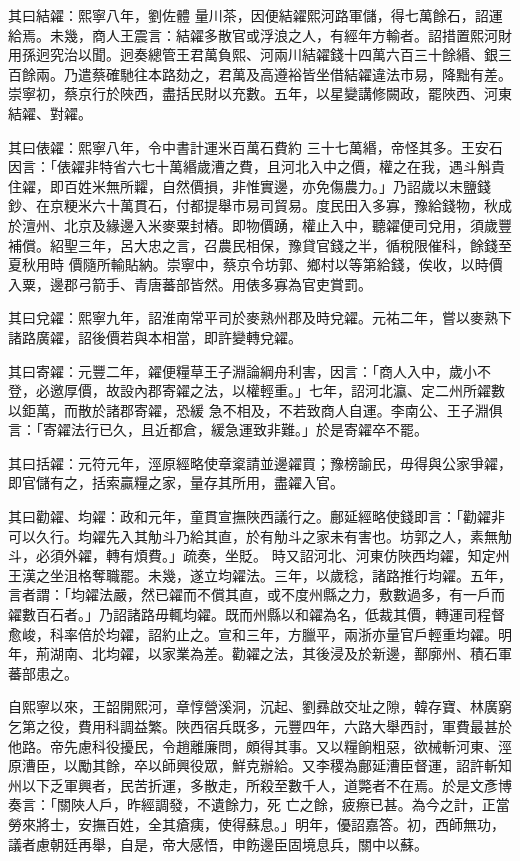 \begin{pinyinscope}
 其曰結糴：熙寧八年，劉佐體
 量川茶，因便結糴熙河路軍儲，得七萬餘石，詔運給焉。未幾，商人王震言：結糴多散官或浮浪之人，有經年方輸者。詔措置熙河財用孫迥究治以聞。迥奏總管王君萬負熙、河兩川結糴錢十四萬六百三十餘緡、銀三百餘兩。乃遣蔡確馳往本路劾之，君萬及高遵裕皆坐借結糴違法市易，降黜有差。崇寧初，蔡京行於陜西，盡括民財以充數。五年，以星變講修闕政，罷陜西、河東結糴、對糴。



 其曰俵糴：熙寧八年，令中書計運米百萬石費約
 三十七萬緡，帝怪其多。王安石因言：「俵糴非特省六七十萬緡歲漕之費，且河北入中之價，權之在我，遇斗斛貴住糴，即百姓米無所糶，自然價損，非惟實邊，亦免傷農力。」乃詔歲以末鹽錢鈔、在京粳米六十萬貫石，付都提舉市易司貿易。度民田入多寡，豫給錢物，秋成於澶州、北京及緣邊入米麥粟封樁。即物價踴，權止入中，聽糴便司兌用，須歲豐補償。紹聖三年，呂大忠之言，召農民相保，豫貸官錢之半，循稅限催科，餘錢至夏秋用時
 價隨所輸貼納。崇寧中，蔡京令坊郭、鄉村以等第給錢，俟收，以時價入粟，邊郡弓箭手、青唐蕃部皆然。用俵多寡為官吏賞罰。



 其曰兌糴：熙寧九年，詔淮南常平司於麥熟州郡及時兌糴。元祐二年，嘗以麥熟下諸路廣糴，詔後價若與本相當，即許變轉兌糴。



 其曰寄糴：元豐二年，糴便糧草王子淵論綱舟利害，因言：「商人入中，歲小不登，必邀厚價，故設內郡寄糴之法，以權輕重。」七年，詔河北瀛、定二州所糴數以鉅萬，而散於諸郡寄糴，恐緩
 急不相及，不若致商人自運。李南公、王子淵俱言：「寄糴法行已久，且近都倉，緩急運致非難。」於是寄糴卒不罷。



 其曰括糴：元符元年，涇原經略使章楶請並邊糴買；豫榜諭民，毋得與公家爭糴，即官儲有之，括索贏糧之家，量存其所用，盡糴入官。



 其曰勸糴、均糴：政和元年，童貫宣撫陜西議行之。鄜延經略使錢即言：「勸糴非可以久行。均糴先入其觔斗乃給其直，於有觔斗之家未有害也。坊郭之人，素無觔斗，必須外糴，轉有煩費。」疏奏，坐貶。
 時又詔河北、河東仿陜西均糴，知定州王漢之坐沮格奪職罷。未幾，遂立均糴法。三年，以歲稔，諸路推行均糴。五年，言者謂：「均糴法嚴，然已糴而不償其直，或不度州縣之力，敷數過多，有一戶而糴數百石者。」乃詔諸路毋輒均糴。既而州縣以和糴為名，低裁其價，轉運司程督愈峻，科率倍於均糴，詔約止之。宣和三年，方臘平，兩浙亦量官戶輕重均糴。明年，荊湖南、北均糴，以家業為差。勸糴之法，其後浸及於新邊，鄯廓州、積石軍蕃部患之。



 自熙寧以來，王韶開熙河，章惇營溪洞，沉起、劉彞啟交址之隙，韓存寶、林廣窮乞第之役，費用科調益繁。陜西宿兵既多，元豐四年，六路大舉西討，軍費最甚於他路。帝先慮科役擾民，令趙離廉問，頗得其事。又以糧餉粗惡，欲械斬河東、涇原漕臣，以勵其餘，卒以師興役眾，鮮克辦給。又李稷為鄜延漕臣督運，詔許斬知州以下乏軍興者，民苦折運，多散走，所殺至數千人，道斃者不在焉。於是文彥博奏言：「關陜人戶，昨經調發，不遺餘力，死
 亡之餘，疲瘵已甚。為今之計，正當勞來將士，安撫百姓，全其瘡痍，使得蘇息。」明年，優詔嘉答。初，西師無功，議者慮朝廷再舉，自是，帝大感悟，申飭邊臣固境息兵，關中以蘇。




\end{pinyinscope}
